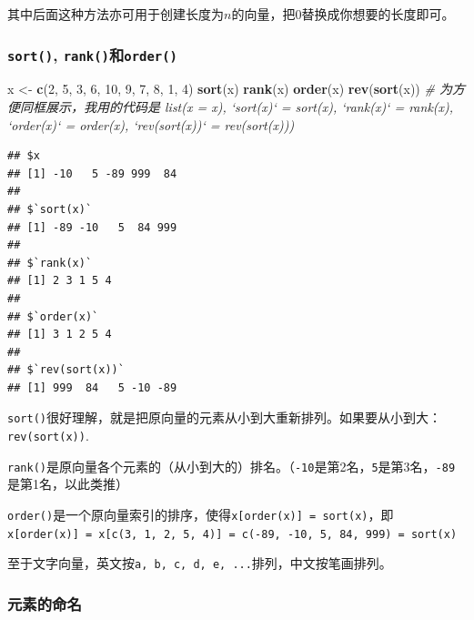 \documentclass[]{book}
\newenvironment{Shaded}{\begin{snugshade}}{\end{snugshade}}
\newcommand{\CommentTok}[1]{\textcolor[rgb]{0.56,0.35,0.01}{\textit{#1}}}
\newcommand{\DecValTok}[1]{\textcolor[rgb]{0.00,0.00,0.81}{#1}}
\newcommand{\KeywordTok}[1]{\textcolor[rgb]{0.13,0.29,0.53}{\textbf{#1}}}
\newcommand{\NormalTok}[1]{#1}
\newcommand{\StringTok}[1]{\textcolor[rgb]{0.31,0.60,0.02}{#1}}
\begin{document}
其中后面这种方法亦可用于创建长度为\(n\)的向量，把0替换成你想要的长度即可。

\hypertarget{sort-rankorder}{%
\subsubsection{\texorpdfstring{\texttt{sort()}, \texttt{rank()}和\texttt{order()}}{sort(), rank()和order()}}\label{sort-rankorder}}

\begin{Shaded}
\begin{Highlighting}[]
\NormalTok{x <-}\StringTok{ }\KeywordTok{c}\NormalTok{(}\DecValTok{2}\NormalTok{, }\DecValTok{5}\NormalTok{, }\DecValTok{3}\NormalTok{, }\DecValTok{6}\NormalTok{, }\DecValTok{10}\NormalTok{, }\DecValTok{9}\NormalTok{, }\DecValTok{7}\NormalTok{, }\DecValTok{8}\NormalTok{, }\DecValTok{1}\NormalTok{, }\DecValTok{4}\NormalTok{)}
\KeywordTok{sort}\NormalTok{(x)}
\KeywordTok{rank}\NormalTok{(x)}
\KeywordTok{order}\NormalTok{(x)}
\KeywordTok{rev}\NormalTok{(}\KeywordTok{sort}\NormalTok{(x))}
\CommentTok{# 为方便同框展示，我用的代码是 list(x = x), `sort(x)` = sort(x), `rank(x)` = rank(x), `order(x)` = order(x), `rev(sort(x))` = rev(sort(x)))}
\end{Highlighting}
\end{Shaded}

\begin{verbatim}
## $x
## [1] -10   5 -89 999  84
## 
## $`sort(x)`
## [1] -89 -10   5  84 999
## 
## $`rank(x)`
## [1] 2 3 1 5 4
## 
## $`order(x)`
## [1] 3 1 2 5 4
## 
## $`rev(sort(x))`
## [1] 999  84   5 -10 -89
\end{verbatim}

\texttt{sort()}很好理解，就是把原向量的元素从小到大重新排列。如果要从小到大：\texttt{rev(sort(x))}.

\texttt{rank()}是原向量各个元素的（从小到大的）排名。（\texttt{-10}是第2名，\texttt{5}是第3名，\texttt{-89}是第1名，以此类推）

\texttt{order()}是一个原向量索引的排序，使得\texttt{x{[}order(x){]}\ =\ sort(x)}，即\texttt{x{[}order(x){]}\ =\ x{[}c(3,\ 1,\ 2,\ 5,\ 4){]}\ =\ c(-89,\ -10,\ 5,\ 84,\ 999)\ =\ sort(x)}

至于文字向量，英文按\texttt{a,\ b,\ c,\ d,\ e,\ ...}排列，中文按笔画排列。

\subsubsection{元素的命名}
\end{document}
